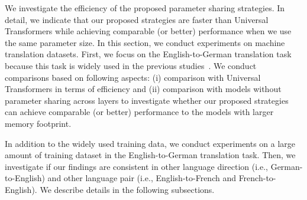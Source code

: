 \documentclass[11pt]{article}
\begin{document}
We investigate the efficiency of the proposed parameter sharing strategies. 
In detail, we indicate that our proposed strategies are faster than Universal Transformers while achieving comparable (or better) performance when we use the same parameter size.
In this section, we conduct experiments on machine translation datasets.
First, we focus on the English-to-German translation task because this task is widely used in the previous studies~\cite{NIPS2017_7181,ott-etal-2018-scaling,dehghani2019,kiyono-etal-2020-tohoku}.
We conduct comparisons based on following aspects: (i) comparison with Universal Transformers in terms of efficiency and 
(ii) comparison with models without parameter sharing across layers to investigate whether our proposed strategies can achieve comparable (or better) performance to the models with larger memory footprint.

In addition to the widely used training data, we conduct experiments on a large amount of training dataset in the English-to-German translation task.
Then, we investigate if our findings are consistent in other language direction (i.e., German-to-English) and other language pair (i.e., English-to-French and French-to-English).
We describe details in the following subsections.
\end{document}

